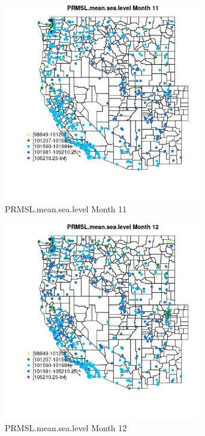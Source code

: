 \begin{figure} 
\centering  
\includegraphics[width=0.77\textwidth]{Code_Outputs/Report_ML_input_PM25_Step4_part_e_de_duplicated_aves_compiled_2019-05-14wNAs_MapObsMo11PRMSLmeansealevel.jpg} 
\caption{\label{fig:Report_ML_input_PM25_Step4_part_e_de_duplicated_aves_compiled_2019-05-14wNAsMapObsMo11PRMSLmeansealevel}PRMSL.mean.sea.level Month 11} 
\end{figure} 
 

\begin{figure} 
\centering  
\includegraphics[width=0.77\textwidth]{Code_Outputs/Report_ML_input_PM25_Step4_part_e_de_duplicated_aves_compiled_2019-05-14wNAs_MapObsMo12PRMSLmeansealevel.jpg} 
\caption{\label{fig:Report_ML_input_PM25_Step4_part_e_de_duplicated_aves_compiled_2019-05-14wNAsMapObsMo12PRMSLmeansealevel}PRMSL.mean.sea.level Month 12} 
\end{figure} 
 

